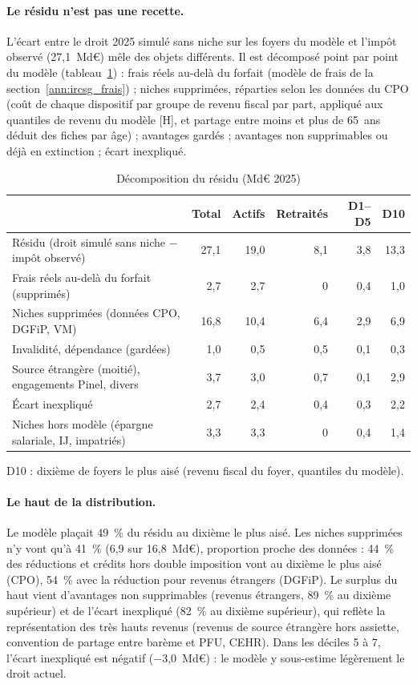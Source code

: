 \paragraph{Le résidu n'est pas une recette.} L'écart entre le droit 2025 simulé sans niche sur les foyers du modèle et l'impôt observé (27,1~Md€) mêle des objets différents. Il est décomposé point par point du modèle (tableau~\ref{tab:ircsg4_res}) : frais réels au-delà du forfait (modèle de frais de la section~\ref{ann:ircsg_frais}) ; niches supprimées, réparties selon les données du CPO (coût de chaque dispositif par groupe de revenu fiscal par part, appliqué aux quantiles de revenu du modèle [H], et partage entre moins et plus de 65~ans déduit des fiches par âge) ; avantages gardés ; avantages non supprimables ou déjà en extinction ; écart inexpliqué.

\begin{table}[h]\centering\footnotesize\setlength{\tabcolsep}{4pt}
\caption{Décomposition du résidu (Md€ 2025)}\label{tab:ircsg4_res}
\begin{tabular}{lrrrrr}\hline
 & Total & Actifs & Retraités & D1--D5 & D10 \\ \hline
Résidu (droit simulé sans niche $-$ impôt observé) & 27{,}1 & 19{,}0 & 8{,}1 & 3{,}8 & 13{,}3 \\
\quad Frais réels au-delà du forfait (supprimés) & 2{,}7 & 2{,}7 & 0 & 0{,}4 & 1{,}0 \\
\quad Niches supprimées (données CPO, DGFiP, VM) & 16{,}8 & 10{,}4 & 6{,}4 & 2{,}9 & 6{,}9 \\
\quad Invalidité, dépendance (gardées) & 1{,}0 & 0{,}5 & 0{,}5 & 0{,}1 & 0{,}3 \\
\quad Source étrangère (moitié), engagements Pinel, divers & 3{,}7 & 3{,}0 & 0{,}7 & 0{,}1 & 2{,}9 \\
\quad Écart inexpliqué & 2{,}7 & 2{,}4 & 0{,}4 & 0{,}3 & 2{,}2 \\ \hline
Niches hors modèle (épargne salariale, IJ, impatriés) & 3{,}3 & 3{,}3 & 0 & 0{,}4 & 1{,}4 \\ \hline
\end{tabular}
\par\footnotesize D10 : dixième de foyers le plus aisé (revenu fiscal du foyer, quantiles du modèle).
\end{table}

\paragraph{Le haut de la distribution.} Le modèle plaçait 49~\% du résidu au dixième le plus aisé. Les niches supprimées n'y vont qu'à 41~\% (6,9 sur 16,8~Md€), proportion proche des données : 44~\% des réductions et crédits hors double imposition vont au dixième le plus aisé (CPO), 54~\% avec la réduction pour revenus étrangers (DGFiP). Le surplus du haut vient d'avantages non supprimables (revenus étrangers, 89~\% au dixième supérieur) et de l'écart inexpliqué (82~\% au dixième supérieur), qui reflète la représentation des très hauts revenus (revenus de source étrangère hors assiette, convention de partage entre barème et PFU, CEHR). Dans les déciles 5 à 7, l'écart inexpliqué est négatif ($-$3,0~Md€) : le modèle y sous-estime légèrement le droit actuel.

